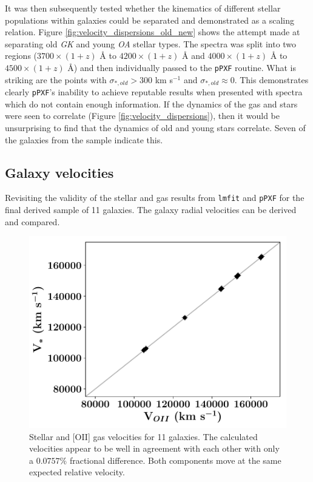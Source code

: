 \documentclass[12pt, twocolumn, nofootinbib]{revtex4-1}    %
\begin{document}
It was then subsequently tested whether the kinematics of different stellar populations within galaxies could be separated and demonstrated as a scaling relation. Figure \ref{fig:velocity_dispersions_old_new} shows the attempt made at separating old \textit{GK} and young \textit{OA} stellar types. The spectra was split into two regions ($3700\times (1+z)$ {\AA} to $4200\times(1+z)$ {\AA} and $4000\times (1+z)$ {\AA} to $4500\times(1+z)$ {\AA}) and then individually passed to the \texttt{pPXF} routine. What is striking are the points with $\sigma_{*,old}>300$ km s$^{-1}$ and $\sigma_{*,old}\approx0$. This demonstrates clearly \texttt{pPXF}'s inability to achieve reputable results when presented with spectra which do not contain enough information. If the dynamics of the gas and stars were seen to correlate (Figure \ref{fig:velocity_dispersions}), then it would be unsurprising to find that the dynamics of old and young stars correlate. Seven of the galaxies from the sample indicate this. 

\vspace{2ex} %
\subsection{Galaxy velocities}
\noindent
Revisiting the validity of the stellar and gas results from \texttt{lmfit} and \texttt{pPXF} for the final derived sample of 11 galaxies. The galaxy radial velocities can be derived and compared. 

\begin{figure}
\includegraphics[width=1.0\linewidth]{data/vel_star_vs_vel_oii}
\caption{Stellar and [OII] gas velocities for 11 galaxies. The calculated velocities appear to be well in agreement with each other with only a $0.0757\%$ fractional difference. Both components move at the same expected relative velocity.}
\label{fig:velocities}
\end{figure}
\end{document}

